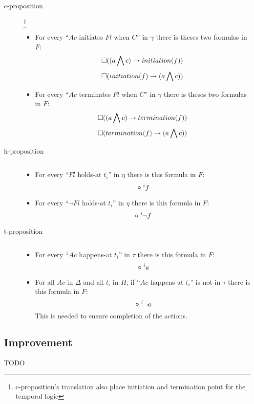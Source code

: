 \begin{description}
  \item[c-proposition]\footnote{c-proposition's translation also place initiation and termination point for the temporal logic}
  \begin{itemize}
    \item For every “$Ac$ initiates $Fl$ when $C$” in $\gamma$ there is theses two formulas in $F$:
      $$\square((a\bigwedge c)\rightarrow initiation(f))$$
      $$\square(initiation(f)\rightarrow (a\bigwedge c))$$
    \item For every “$Ac$ terminates $Fl$ when $C$” in $\gamma$ there is theses two formulas in $F$:
      $$\square((a\bigwedge c)\rightarrow termination(f))$$
      $$\square(termination(f)\rightarrow (a\bigwedge c))$$
  \end{itemize}
  \item[h-proposition] $ $
  \begin{itemize}
    \item For every “$Fl$ holds-at $t_i$” in $\eta$ there is this formula in $F$:
      $$\next^{i}f$$
    \item For every “$\neg Fl$ holds-at $t_i$” in $\eta$ there is this formula in $F$:
      $$\next^{i} \neg f$$
  \end{itemize}
  \item[t-proposition] $ $
  \begin{itemize}
    \item For every “$Ac$ happens-at $t_i$” in $\tau$ there is this formula in $F$:
      $$\next^{i}a$$
    \item For all $Ac$ in $\Delta$ and all $t_i$ in $\Pi$, if “$Ac$ happens-at $t_i$” is not in $\tau$ there is this formula in $F$:
      $$\next^{i}\neg a$$
      This is needed to ensure completion of the actions.

  \end{itemize}
\end{description}

\subsection{Improvement}

TODO

